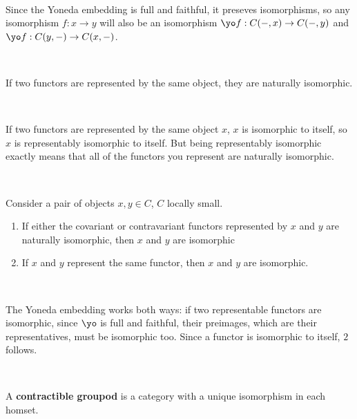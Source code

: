 \documentclass{article}
\begin{document}
\begin{customproof}
\

Since the Yoneda embedding is full and faithful, it preseves isomorphisms, so any isomorphism $f: x \to y$ will also be an isomorphism $\yo f: C(-,x) \to C(-,y)$ and $\yo f: C(y,-) \to C(x,-)$.
\end{customproof}

\begin{corollary}
\

If two functors are represented by the same object, they are naturally isomorphic.
\end{corollary}

\begin{customproof}
\

If two functors are represented by the same object $x$, $x$ is isomorphic to itself, so $x$ is representably isomorphic to itself. But being representably isomorphic exactly means that all of the functors you represent are naturally isomorphic. 
\end{customproof}

\begin{proposition}
\

Consider a pair of objects $x,y \in C$, $C$ locally small. 

\begin{enumerate}
	\item If either the covariant or contravariant functors represented by $x$ and $y$ are naturally isomorphic, then $x$ and $y$ are isomorphic
	\item If $x$ and $y$ represent the same functor, then $x$ and $y$ are isomorphic.
\end{enumerate}
\end{proposition}

\begin{customproof}
\

The Yoneda embedding works both ways: if two representable functors are isomorphic, since $\yo$ is full and faithful, their preimages, which are their representatives, must be isomorphic too. Since a functor is isomorphic to itself, $2$ follows.
\end{customproof}

\begin{definition}
\

A \textbf{contractible groupod} is a category with a unique isomorphism in each homset. 
\end{definition}
\end{document}
